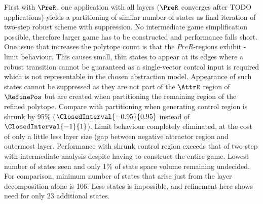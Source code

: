 
    First with $\PreR$, one application with all layers ($\PreR$ converges after TODO applications) yields a partitioning of similar number of states as final iteration of two-step robust scheme with suppression.
    No intermediate game simplification possible, therefore larger game has to be constructed and performance falls short.
    One issue that increases the polytope count is that the $PreR$-regions exhibit \epsilon-limit behaviour.
    This causes small, thin states to appear at its edges where a robust transition cannot be guaranteed as a single-vector control input is required which is not representable in the chosen abstraction model.
    Appearance of such states cannot be suppressed as they are not part of the $\AttrR$ region of $\RefinePos$ but are created when partitioning the remaining region of the refined polytope.
    Compare with partitioning when generating control region is shrunk by 95\% ($\ClosedInterval{-0.95}{0.95}$ instead of $\ClosedInterval{-1}{1}$).
    Limit behaviour completely eliminated, at the cost of only a little less layer size (gap between negative attractor region and outermost layer.
    Performance with shrunk control region exceeds that of two-step with intermediate analysis despite having to construct the entire game.
    Lowest number of states seen and only 1\% of state space volume remaining undecided.
    For comparison, minimum number of states that arise just from the layer decomposition alone is 106.
    Less states is impossible, and refinement here shows need for only 23 additional states.

